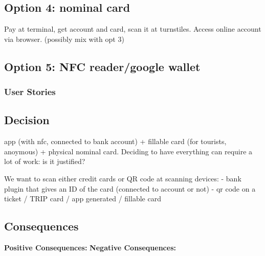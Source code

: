 \subsection*{Option 4: nominal card}
Pay at terminal, get account and card, scan it at turnstiles. Access online account via browser. (possibly mix with opt 3)

\subsection*{Option 5: NFC reader/google wallet}


\subsubsection*{User Stories}
\subsection*{Decision}
app (with nfc, connected to bank account) + fillable card (for tourists, anoymous) + physical nominal card.
Deciding to have everything can require a lot of work: is it justified?

We want to scan either credit cards or QR code at scanning devices:
    - bank plugin that gives an ID of the card (connected to account or not) 
    - qr code on a ticket / TRIP card / app generated / fillable card
\subsection*{Consequences}
\textbf{Positive Consequences:}
\textbf{Negative Consequences:}
